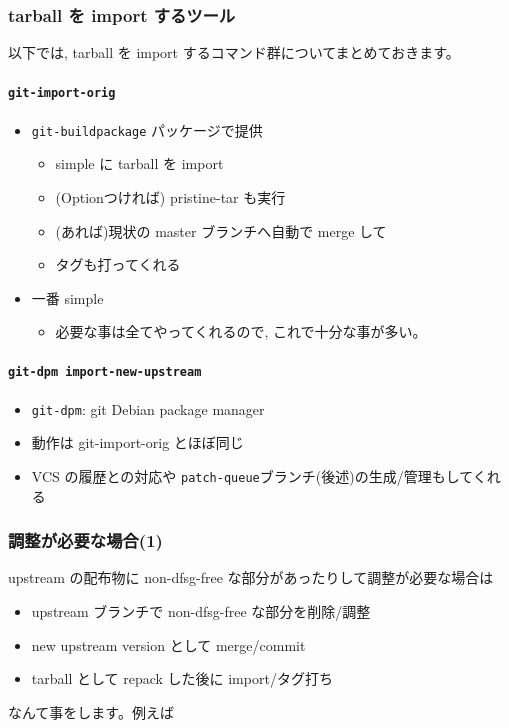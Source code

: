 \documentclass[mingoth,a4paper]{jsarticle}
\begin{document}
\subsubsection*{tarball を import するツール}

以下では, tarball を import するコマンド群についてまとめておきます。

\paragraph{\texttt{git-import-orig}}
\begin{itemize}
\item \texttt{git-buildpackage} パッケージで提供
  \begin{itemize}
  \item simple に tarball を import
  \item (Optionつければ) pristine-tar も実行
  \item (あれば)現状の master ブランチへ自動で merge して
  \item タグも打ってくれる
  \end{itemize}
\item 一番 simple
  \begin{itemize}
  \item 必要な事は全てやってくれるので, これで十分な事が多い。
  \end{itemize}
\end{itemize}

\paragraph{\texttt{git-dpm import-new-upstream}}

\begin{itemize}
\item \texttt{git-dpm}: git Debian package manager
\item 動作は git-import-orig とほぼ同じ
\item VCS の履歴との対応や \texttt{patch-queue}ブランチ(後述)の生成/管理もしてくれる
\end{itemize}

\subsubsection*{調整が必要な場合(1)}

upstream の配布物に non-dfsg-free な部分があったりして調整が必要な場合は
\begin{itemize}
\item upstream ブランチで non-dfsg-free な部分を削除/調整
\item new upstream version として merge/commit
\item tarball として repack した後に import/タグ打ち
\end{itemize}
なんて事をします。例えば
\end{document}
